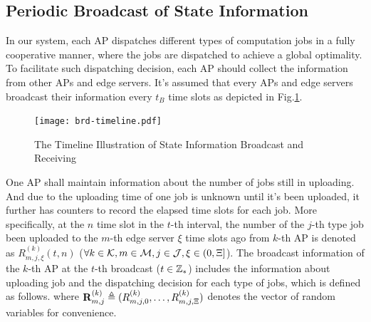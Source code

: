 
\subsection{Periodic Broadcast of State Information}
In our system, each AP dispatches different types of computation jobs in a fully cooperative manner, where the jobs are dispatched to achieve a global optimality.
To facilitate such dispatching decision, each AP should collect the information from other APs and edge servers.
It's assumed that every APs and edge servers broadcast their information every $t_B$ time slots as depicted in Fig.\ref{fig:brd-timeline}.
\begin{figure}[ht]
    \centering
    \texttt{[image: brd-timeline.pdf]}
    \caption{The Timeline Illustration of State Information Broadcast and Receiving}
    \label{fig:brd-timeline}
\end{figure}

One AP shall maintain information about the number of jobs still in uploading. 
And due to the uploading time of one job is unknown until it's been uploaded, it further has counters to record the elapsed time slots for each job.
More specifically, at the $n$ time slot in the $t$-th interval, the number of the $j$-th type job been uploaded to the $m$-th edge server $\xi$ time slots ago from $k$-th AP is denoted as $R^{(k)}_{m,j,\xi}({t,n})$ ($\forall k\in\mathcal{K}, m\in\mathcal{M}, j\in\mathcal{J}, \xi\in(0,\Xi]$).
The broadcast information of the $k$-th AP at the $t$-th broadcast ($t\in\mathbb{Z}_{*}$) includes the information about uploading job and the dispatching decision for each type of jobs, which is defined as follows.
where $\mathbf{R}^{(k)}_{m,j} \triangleq ( R^{(k)}_{m,j,0},\dots,R^{(k)}_{m,j,\Xi} )$ denotes the vector of random variables for convenience.

